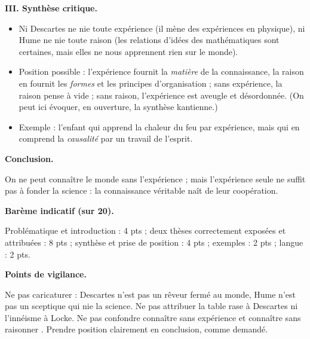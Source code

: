 \documentclass[11pt]{article}
\begin{document}
\begin{corrige}
\textbf{III. Synthèse critique.}\par
\begin{itemize}
\item Ni Descartes ne nie toute expérience (il mène des expériences en physique), ni Hume ne nie toute raison (les \guillemotleft relations d'idées \guillemotright des mathématiques sont certaines, mais elles ne nous apprennent rien sur le monde).
\item Position possible : l'expérience fournit la \emph{matière} de la connaissance, la raison en fournit les \emph{formes} et les principes d'organisation ; sans expérience, la raison pense à vide ; sans raison, l'expérience est aveugle et désordonnée. (On peut ici évoquer, en ouverture, la synthèse kantienne.)
\item Exemple : l'enfant qui apprend la chaleur du feu par expérience, mais qui en comprend la \emph{causalité} par un travail de l'esprit.
\end{itemize}

\textbf{Conclusion.}\par On ne peut connaître le monde sans l'expérience ; mais l'expérience seule ne suffit pas à fonder la science : la connaissance véritable naît de leur coopération.

\textbf{Barème indicatif (sur 20).}\par Problématique et introduction : 4 pts ; deux thèses correctement exposées et attribuées : 8 pts ; synthèse et prise de position : 4 pts ; exemples : 2 pts ; langue : 2 pts.

\textbf{Points de vigilance.}\par Ne pas caricaturer : Descartes n'est pas un rêveur fermé au monde, Hume n'est pas un sceptique qui nie la science. Ne pas attribuer la \guillemotleft table rase \guillemotright à Descartes ni l'innéisme à Locke. Ne pas confondre \guillemotleft connaître sans expérience \guillemotright et \guillemotleft connaître sans raisonner \guillemotright. Prendre position clairement en conclusion, comme demandé.

\end{corrige}
\end{document}
